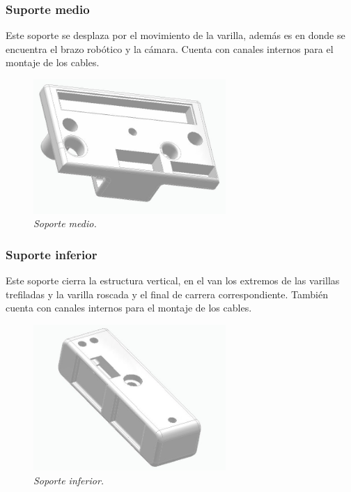 \subsubsection{Suporte medio}
Este soporte se desplaza por el movimiento de la varilla, además es en donde se encuentra el brazo robótico y la cámara. Cuenta con canales internos para el montaje de los cables. \\
\begin{figure}[H]
    \centering
\includegraphics[width=0.65\textwidth]{img/medio.jpg} \par
    \caption{\textit{Soporte medio.}}
    \label{fig:soporte_medio}
\end{figure}


\subsubsection{Suporte inferior}
Este soporte cierra la estructura vertical, en el van los extremos de las varillas trefiladas y la varilla roscada y el final de carrera correspondiente. También cuenta con canales internos para el montaje de los cables. \\
\begin{figure}[H]
    \centering
\includegraphics[width=0.65\textwidth]{img/inferior_completo.jpg} \par
    \caption{\textit{Soporte inferior.}}
    \label{fig:soporte_inferior}
\end{figure}

